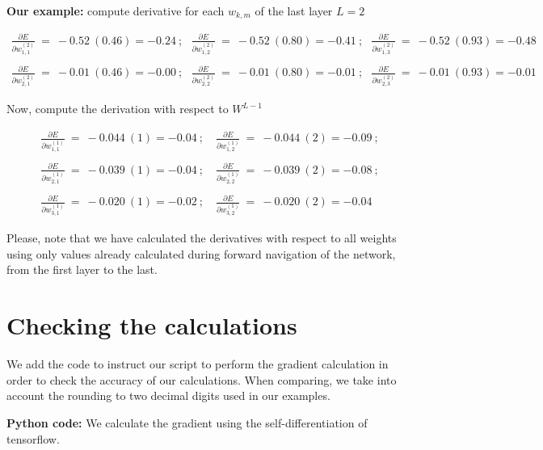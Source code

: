 \documentclass{article}
\begin{document}
\textbf{Our example:}  compute derivative for each  $w_{k,m}$ of the last layer $L=2$


{\small
\begin{gather*}
\frac{\partial E}{\partial w_{1,1}^{( 2)}} \ =\ -0.52\ ( 0.46 ) = -0.24 \ ;\ \ \ 
\frac{\partial E}{\partial w_{1,2}^{( 2)}} \ =\ -0.52\ ( 0.80 ) = -0.41 \ ;\ \ \ 
\frac{\partial E}{\partial w_{1,3}^{( 2)}} \ =\ -0.52\ ( 0.93 ) = -0.48 \\
\\
\frac{\partial E}{\partial w_{2,1}^{( 2)}} \ =\ -0.01\ ( 0.46 ) = -0.00 \ ;\ \ \ 
\frac{\partial E}{\partial w_{2,2}^{( 2)}} \ =\ -0.01\ ( 0.80 ) = -0.01 \ ;\ \ \ 
\frac{\partial E}{\partial w_{2,3}^{( 2)}} \ =\ -0.01\ ( 0.93 ) = -0.01
\end{gather*}
}


Now, compute the derivation with respect to $W^{L-1}$


{\small
\begin{gather*}
\frac{\partial E}{\partial w_{1,1}^{( 1)}} \ =\ -0.044\ ( 1 ) = -0.04 \ ;\quad 
\frac{\partial E}{\partial w_{1,2}^{( 1)}} \ =\ -0.044\ ( 2 ) = -0.09 \ ;\\
\\
\frac{\partial E}{\partial w_{2,1}^{( 1)}} \ =\ -0.039\ ( 1 ) = -0.04 \ ;\quad 
\frac{\partial E}{\partial w_{2,2}^{( 1)}} \ =\ -0.039\ ( 2 ) = -0.08 \ ;\\
\\
\frac{\partial E}{\partial w_{3,1}^{( 1)}} \ =\ -0.020\ ( 1 ) = -0.02 \ ;\quad 
\frac{\partial E}{\partial w_{3,2}^{( 1)}} \ =\ -0.020\ ( 2 ) = -0.04
\end{gather*}
}

Please, note that we have calculated the derivatives with respect to all weights using only values already calculated during forward navigation of the network, from the first layer to the last.


\section{Checking the calculations}

We add the code to instruct our script to perform the gradient calculation in order to check the accuracy of our calculations. When comparing, we take into account the rounding to two decimal digits used in our examples.


\textbf{Python code:} We calculate the gradient using the self-differentiation of tensorflow.
\end{document}
